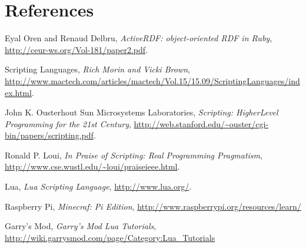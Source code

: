 \documentclass[12pt]{article}
\begin{document}
\section{References}
\begin{description}
\item Eyal Oren and Renaud Delbru, \emph{ActiveRDF: object-oriented RDF in Ruby}, \url{http://ceur-ws.org/Vol-181/paper2.pdf}.
\item Scripting Languages, \emph{Rich Morin and Vicki Brown}, \url{http://www.mactech.com/articles/mactech/Vol.15/15.09/ScriptingLanguages/index.html}.
\item John K. Ousterhout Sun Microsystems Laboratories, \emph{Scripting: HigherLevel Programming for the 21st Century}, \url{http://web.stanford.edu/~ouster/cgi-bin/papers/scripting.pdf}.
\item Ronald P. Loui, \emph{In Praise of Scripting:  Real Programming Pragmatism}, \url{http://www.cse.wustl.edu/~loui/praiseieee.html}.
\item Lua, \emph{Lua Scripting Language}, \url {http://www.lua.org/}.
\item Raspberry Pi, \emph{Minecraf: Pi Edition}, \url{http://www.raspberrypi.org/resources/learn/}
\item Garry's Mod, \emph{Garry’s Mod Lua Tutorials}, \url{http://wiki.garrysmod.com/page/Category:Lua_Tutorials}


\end{description}
\end{document}
